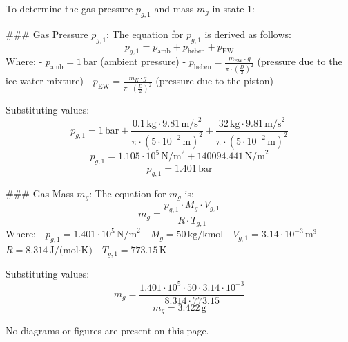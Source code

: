To determine the gas pressure \( p_{g,1} \) and mass \( m_g \) in state 1:

### Gas Pressure \( p_{g,1} \):
The equation for \( p_{g,1} \) is derived as follows:  
\[
p_{g,1} = p_{\text{amb}} + p_{\text{heben}} + p_{\text{EW}}
\]
Where:  
- \( p_{\text{amb}} = 1 \, \text{bar} \) (ambient pressure)  
- \( p_{\text{heben}} = \frac{m_{\text{EW}} \cdot g}{\pi \cdot \left(\frac{D}{2}\right)^2} \) (pressure due to the ice-water mixture)  
- \( p_{\text{EW}} = \frac{m_K \cdot g}{\pi \cdot \left(\frac{D}{2}\right)^2} \) (pressure due to the piston)  

Substituting values:  
\[
p_{g,1} = 1 \, \text{bar} + \frac{0.1 \, \text{kg} \cdot 9.81 \, \text{m/s}^2}{\pi \cdot \left(5 \cdot 10^{-2} \, \text{m}\right)^2} + \frac{32 \, \text{kg} \cdot 9.81 \, \text{m/s}^2}{\pi \cdot \left(5 \cdot 10^{-2} \, \text{m}\right)^2}
\]
\[
p_{g,1} = 1.105 \cdot 10^5 \, \text{N/m}^2 + 140094.441 \, \text{N/m}^2
\]
\[
p_{g,1} = 1.401 \, \text{bar}
\]

### Gas Mass \( m_g \):
The equation for \( m_g \) is:  
\[
m_g = \frac{p_{g,1} \cdot M_g \cdot V_{g,1}}{R \cdot T_{g,1}}
\]
Where:  
- \( p_{g,1} = 1.401 \cdot 10^5 \, \text{N/m}^2 \)  
- \( M_g = 50 \, \text{kg/kmol} \)  
- \( V_{g,1} = 3.14 \cdot 10^{-3} \, \text{m}^3 \)  
- \( R = 8.314 \, \text{J/(mol·K)} \)  
- \( T_{g,1} = 773.15 \, \text{K} \)  

Substituting values:  
\[
m_g = \frac{1.401 \cdot 10^5 \cdot 50 \cdot 3.14 \cdot 10^{-3}}{8.314 \cdot 773.15}
\]
\[
m_g = 3.422 \, \text{g}
\]  

No diagrams or figures are present on this page.